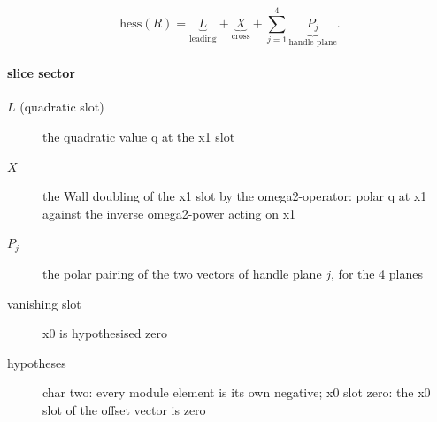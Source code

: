 \[\mathrm{hess}(R)=\underbrace{L}_{\text{leading}}+\underbrace{X}_{\text{cross}}+\sum_{j=1}^{4}\underbrace{P_j}_{\text{handle plane}}.\]
\paragraph{slice sector}
\begin{description}
\item[$L$ (quadratic slot)] the quadratic value q at the x1 slot
\item[$X$] the Wall doubling of the x1 slot by the omega2-operator: polar q at x1 against the inverse omega2-power acting on x1
\item[$P_j$] the polar pairing of the two vectors of handle plane $j$, for the 4 planes
\item[vanishing slot] x0 is hypothesised zero
\item[hypotheses] char two: every module element is its own negative; x0 slot zero: the x0 slot of the offset vector is zero
\end{description}
